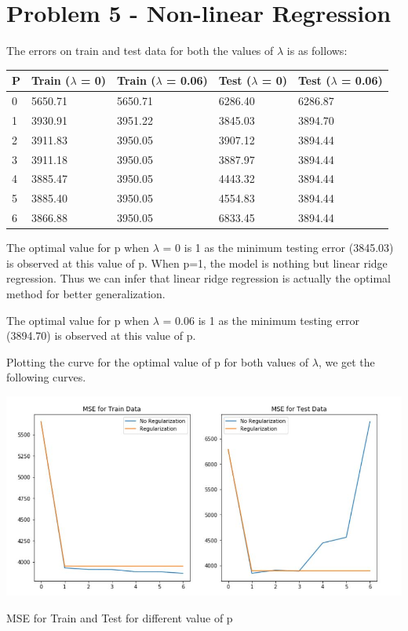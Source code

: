 \documentclass[12pt]{extarticle}
\begin{document}
\newpage
\section{Problem 5 - Non-linear Regression}

The errors on train and test data for both the values of $\lambda$ is as follows:
\newline

\vspace{5mm}
\begin{tabularx}{\textwidth}{|X|l|l|l|l|}
\hline
\rowcolor[HTML]{FFCE93} 
P & Train ($\lambda$ = 0) & Train ($\lambda$ = 0.06)&Test ($\lambda$ = 0)&Test ($\lambda$ = 0.06) \\ \hline

0 & 5650.71&5650.71&6286.40 &6286.87\\ \hline
1  & 3930.91 & 3951.22 & 3845.03 & 3894.70\\ \hline
2& 3911.83 & 3950.05 & 3907.12 & 3894.44\\ \hline
3 & 3911.18 & 3950.05 & 3887.97 & 3894.44\\ \hline
4 & 3885.47 & 3950.05 & 4443.32 & 3894.44\\ \hline
5 & 3885.40 & 3950.05 & 4554.83 & 3894.44\\ \hline
6 & 3866.88&3950.05 & 6833.45 & 3894.44\\ \hline

\end{tabularx}

\vspace{5mm}
The optimal value for p when $\lambda$ = 0 is 1 as the minimum testing error (3845.03) is observed at this value of p. When p=1, the model is nothing but linear ridge regression. Thus we can infer that linear ridge regression is actually the optimal method for better generalization.

\newline
The optimal value for p when $\lambda$ = 0.06 is 1 as the minimum testing error (3894.70) is observed at this value of p. 

Plotting the curve for the optimal value of p for both values of $\lambda$, we get the following curves.

\begin{center}
  \centering
  \includegraphics[width=\textwidth]{Q5.JPG}
  \caption{MSE for Train and Test for different value of p }
\end{center}
\end{document}

